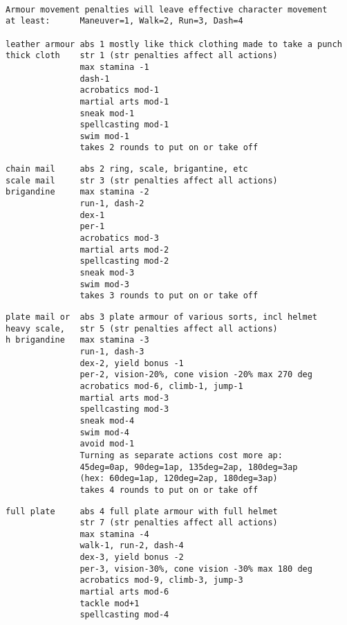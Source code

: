 \

\goodbreak \small \begin{samepage} \begin{verbatim}
Armour movement penalties will leave effective character movement
at least:      Maneuver=1, Walk=2, Run=3, Dash=4

leather armour abs 1 mostly like thick clothing made to take a punch
thick cloth    str 1 (str penalties affect all actions)
               max stamina -1
               dash-1
               acrobatics mod-1
               martial arts mod-1
               sneak mod-1
               spellcasting mod-1
               swim mod-1
               takes 2 rounds to put on or take off
\end{verbatim} \blocklistgap \begin{verbatim}
chain mail     abs 2 ring, scale, brigantine, etc
scale mail     str 3 (str penalties affect all actions)
brigandine     max stamina -2
               run-1, dash-2
               dex-1
               per-1
               acrobatics mod-3
               martial arts mod-2
               spellcasting mod-2
               sneak mod-3
               swim mod-3
               takes 3 rounds to put on or take off
\end{verbatim} \blocklistgap \begin{verbatim}
plate mail or  abs 3 plate armour of various sorts, incl helmet
heavy scale,   str 5 (str penalties affect all actions)
h brigandine   max stamina -3
               run-1, dash-3
               dex-2, yield bonus -1
               per-2, vision-20%, cone vision -20% max 270 deg
               acrobatics mod-6, climb-1, jump-1
               martial arts mod-3
               spellcasting mod-3
               sneak mod-4
               swim mod-4
               avoid mod-1
               Turning as separate actions cost more ap:
               45deg=0ap, 90deg=1ap, 135deg=2ap, 180deg=3ap
               (hex: 60deg=1ap, 120deg=2ap, 180deg=3ap)
               takes 4 rounds to put on or take off
\end{verbatim} \blocklistgap \begin{verbatim}
full plate     abs 4 full plate armour with full helmet
               str 7 (str penalties affect all actions)
               max stamina -4
               walk-1, run-2, dash-4
               dex-3, yield bonus -2
               per-3, vision-30%, cone vision -30% max 180 deg
               acrobatics mod-9, climb-3, jump-3
               martial arts mod-6
               tackle mod+1
               spellcasting mod-4

\end{verbatim}
\end{samepage}
